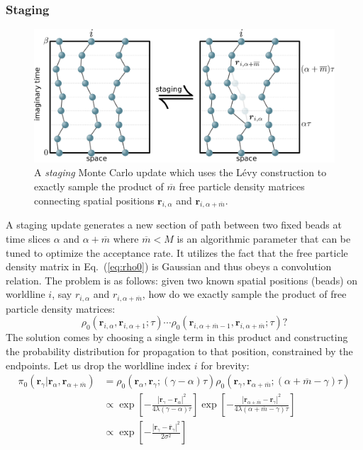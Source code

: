 \documentclass[prb,aps,amssym,nofootinbib,floatfix,notitlepage]{revtex4-1}
\renewcommand{\vec}[1]{\boldsymbol{#1}}
\renewcommand{\eqref}[1]{Eq.~(\ref{#1})}
\begin{document}
\subsubsection{Staging}
%
\begin{figure}
\begin{center}
\includegraphics[width=0.75\columnwidth]{Figures/staging.pdf}
\end{center}
\caption{A \emph{staging} Monte Carlo update which uses the L\'{e}vy
construction to exactly sample the product of $\overline{m}$ free particle
density matrices connecting spatial positions $\vec{r}_{i,\alpha}$ and
$\vec{r}_{i,\alpha+\overline{m}}$.}
\label{fig:staging}
 \end{figure}
%
A staging update \cite{Sprik:1985bz} generates a new section of path between
two fixed beads at time slices $\alpha$ and $\alpha+\overline{m}$ where
$\overline{m} < M$ is an algorithmic parameter that can be tuned to optimize
the acceptance rate. It
utilizes the fact that the free particle density matrix in \eqref{eq:rho0} is
Gaussian and thus obeys a convolution relation.  The problem is as follows:
given two known spatial positions (beads) on worldline $i$, say $r_{i,\alpha}$
and $r_{i,\alpha+\overline{m}}$, how do we exactly sample the product of free particle
density matrices:
%
\begin{equation}
    \rho_0(\vec{r}_{i,\alpha},\vec{r}_{i,\alpha+1};\tau) \cdots
    \rho_0(\vec{r}_{i,\alpha+\overline{m}-1},\vec{r}_{i,\alpha+\overline{m}};\tau)?
\end{equation}
%
The solution comes by choosing a single term in this product and constructing
the probability distribution for propagation to that position, constrained by the
endpoints. Let us drop the worldline index $i$ for brevity:  
%
\begin{align}
    \pi_0(\vec{r}_\gamma| \vec{r}_{\alpha},\vec{r}_{\alpha+\overline{m}}) &=
    \rho_0(\vec{r}_\alpha,\vec{r}_\gamma;(\gamma-\alpha)\tau) 
\rho_0(\vec{r}_\gamma,\vec{r}_{\alpha+\overline{m}};(\alpha+\overline{m}-\gamma)\tau) \nonumber \\
&\propto 
\exp\left[-\frac{|\vec{r}_\gamma-\vec{r}_{\alpha}|^2}{4\lambda (\gamma-\alpha)\tau} \right]
\exp\left[-\frac{|\vec{r}_{\alpha+\overline{m}}-\vec{r}_{\gamma}|^2}{4\lambda
(\alpha+\overline{m}-\gamma)\tau} \right]
\nonumber \\
&\propto \exp\left[-\frac{|\vec{r}_\gamma-\overline{\vec{r}}_{\gamma}|^2}{2 \sigma^2}\right]
\label{eq:pi0}
\end{align}
\end{document}
